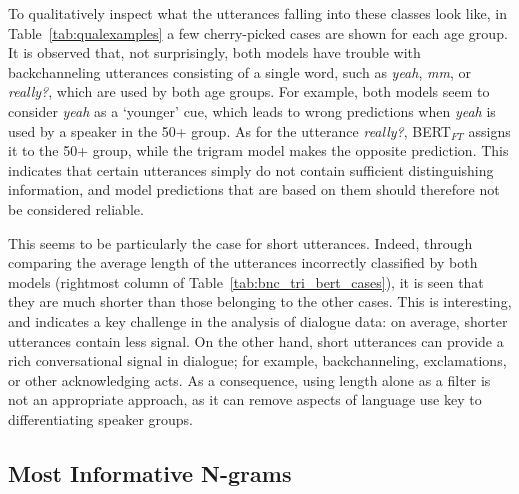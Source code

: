 To qualitatively inspect what the utterances falling into these classes look like, in Table~\ref{tab:qualexamples} a few cherry-picked cases are shown for each age group. 
It is observed that, not surprisingly, both models have trouble with backchanneling utterances consisting of a single word, such as \emph{yeah}, \emph{mm}, or \emph{really?}, which are used by both age groups.
For example, both models seem to consider \emph{yeah} as a `younger' cue, which leads to wrong predictions when \emph{yeah} is used by a speaker in the 50+ group. As for the utterance \emph{really?}, BERT$_{FT}$ assigns it to the 50+ group, while the trigram model makes the opposite prediction.
This indicates that certain utterances simply do not contain sufficient distinguishing information, and model predictions that are based on them should therefore not be considered reliable.

This seems to be particularly the case for short utterances. Indeed, through comparing the average length of the utterances incorrectly classified by both models (rightmost column of Table~\ref{tab:bnc_tri_bert_cases}), it is seen that they are much shorter than those belonging to the other cases. This is interesting, and indicates a key challenge in the analysis of dialogue data: 
on average, shorter utterances contain less signal. On the other hand, short utterances can provide a rich conversational signal in dialogue; for example, backchanneling, exclamations, or other acknowledging acts. As a consequence, using length alone as a filter is not an appropriate approach, as it can remove aspects of language use key to differentiating speaker groups.


\subsection{Most Informative N-grams}
\label{subsec:exp1_most_inf_ngrams}

